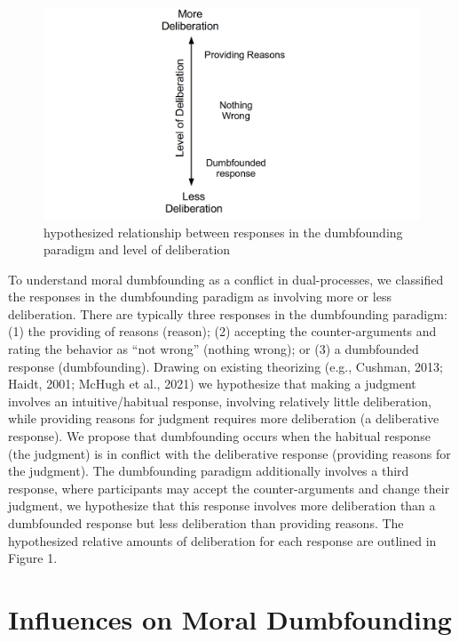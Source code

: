 \documentclass[
  american,
  man,floatsintext]{apa7}
\begin{document}
\begin{figure}
\centering
\includegraphics{../resources/images/responses_figure2.png}
\caption{hypothesized relationship between responses in the dumbfounding paradigm and level of deliberation}
\end{figure}

To understand moral dumbfounding as a conflict in dual-processes, we classified the responses in the dumbfounding paradigm as involving more or less deliberation. There are typically three responses in the dumbfounding paradigm: (1) the providing of reasons (reason); (2) accepting the counter-arguments and rating the behavior as ``not wrong'' (nothing wrong); or (3) a dumbfounded response (dumbfounding). Drawing on existing theorizing (e.g., Cushman, 2013; Haidt, 2001; McHugh et al., 2021) we hypothesize that making a judgment involves an intuitive/habitual response, involving relatively little deliberation, while providing reasons for judgment requires more deliberation (a deliberative response). We propose that dumbfounding occurs when the habitual response (the judgment) is in conflict with the deliberative response (providing reasons for the judgment). The dumbfounding paradigm additionally involves a third response, where participants may accept the counter-arguments and change their judgment, we hypothesize that this response involves more deliberation than a dumbfounded response but less deliberation than providing reasons. The hypothesized relative amounts of deliberation for each response are outlined in Figure 1.

\hypertarget{influences-on-moral-dumbfounding}{%
\section{Influences on Moral Dumbfounding}\label{influences-on-moral-dumbfounding}}
\end{document}
